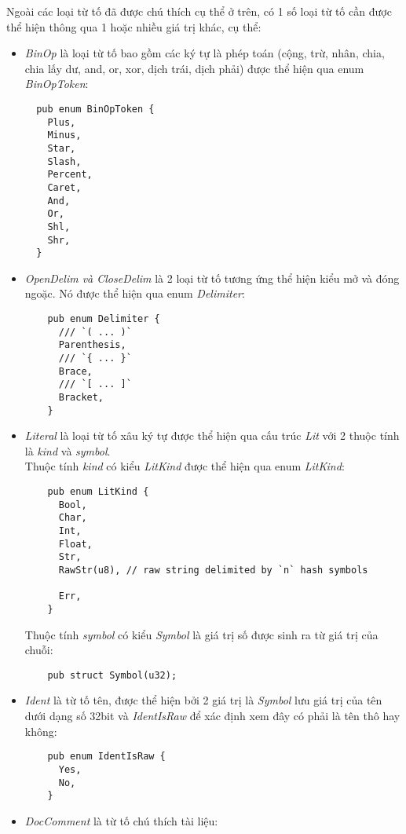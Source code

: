 Ngoài các loại từ tố đã được chú thích cụ thể ở trên, có 1 số loại từ tố cần được thể hiện thông qua 1 hoặc nhiều giá trị khác, cụ thể:
\begin{itemize}
  \item \textit{BinOp} là loại từ tố bao gồm các ký tự là phép toán (cộng, trừ, nhân, chia, chia lấy dư, and, or, xor, dịch trái, dịch phải) được thể hiện qua enum \textit{BinOpToken}:
  \begin{lstlisting}
  pub enum BinOpToken {
    Plus,
    Minus,
    Star,
    Slash,
    Percent,
    Caret,
    And,
    Or,
    Shl,
    Shr,
  }
  \end{lstlisting}
  \item \textit{OpenDelim \emph{và} CloseDelim} là 2 loại từ tố tương ứng thể hiện kiểu mở và đóng ngoặc. Nó được thể hiện qua enum \textit{Delimiter}:
  \begin{lstlisting}
    pub enum Delimiter {
      /// `( ... )`
      Parenthesis,
      /// `{ ... }`
      Brace,
      /// `[ ... ]`
      Bracket,
    }        
  \end{lstlisting}
  \item \textit{Literal} là loại từ tố xâu ký tự được thể hiện qua cấu trúc \textit{Lit} với 2 thuộc tính là \textit{kind} và \textit{symbol}. 
  \\Thuộc tính \textit{kind} có kiểu \textit{LitKind} được thể hiện qua enum \textit{LitKind}: 
  \begin{lstlisting}
    pub enum LitKind {
      Bool,
      Char,
      Int,
      Float,
      Str,
      RawStr(u8), // raw string delimited by `n` hash symbols
  
      Err,
    }
  \end{lstlisting}
  Thuộc tính \textit{symbol} có kiểu \textit{Symbol} là giá trị số được sinh ra từ giá trị của chuỗi:
  \begin{lstlisting}
    pub struct Symbol(u32);
  \end{lstlisting}


  \item \textit{Ident} là từ tố tên, được thể hiện bởi 2 giá trị là \textit{Symbol} lưu giá trị của tên dưới dạng số 32bit và \textit{IdentIsRaw} để xác định xem đây có phải là tên thô hay không:
  \begin{lstlisting}
    pub enum IdentIsRaw {
      Yes,
      No,
    }
  \end{lstlisting}
  
  \item \textit{DocComment} là từ tố chú thích tài liệu:
  


\end{itemize}
